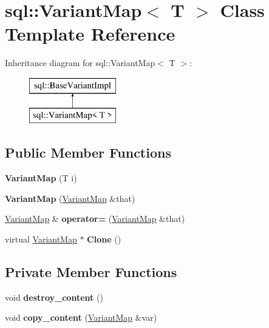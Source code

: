 \hypertarget{classsql_1_1_variant_map}{}\section{sql\+:\+:Variant\+Map$<$ T $>$ Class Template Reference}
\label{classsql_1_1_variant_map}
Inheritance diagram for sql\+:\+:Variant\+Map$<$ T $>$\+:\begin{figure}[H]
\begin{center}
\leavevmode
\includegraphics[height=2.000000cm]{classsql_1_1_variant_map}
\end{center}
\end{figure}
\subsection*{Public Member Functions}
\begin{DoxyCompactItemize}
\item 
\hypertarget{classsql_1_1_variant_map_a57a3ef9f7780d378e7e8ec2d6f2782db}{}\label{classsql_1_1_variant_map_a57a3ef9f7780d378e7e8ec2d6f2782db} 
{\bfseries Variant\+Map} (T i)
\item 
\hypertarget{classsql_1_1_variant_map_a460d04a63f6efdb9f8e23f541faefb39}{}\label{classsql_1_1_variant_map_a460d04a63f6efdb9f8e23f541faefb39} 
{\bfseries Variant\+Map} (\hyperlink{classsql_1_1_variant_map}{Variant\+Map} \&that)
\item 
\hypertarget{classsql_1_1_variant_map_ac1962c1da18635bc551264e1821dc5d2}{}\label{classsql_1_1_variant_map_ac1962c1da18635bc551264e1821dc5d2} 
\hyperlink{classsql_1_1_variant_map}{Variant\+Map} \& {\bfseries operator=} (\hyperlink{classsql_1_1_variant_map}{Variant\+Map} \&that)
\item 
\hypertarget{classsql_1_1_variant_map_a6fad5d2f5006961456fb8f8ef649c0bc}{}\label{classsql_1_1_variant_map_a6fad5d2f5006961456fb8f8ef649c0bc} 
virtual \hyperlink{classsql_1_1_variant_map}{Variant\+Map} $\ast$ {\bfseries Clone} ()
\end{DoxyCompactItemize}
\subsection*{Private Member Functions}
\begin{DoxyCompactItemize}
\item 
\hypertarget{classsql_1_1_variant_map_affb399a36ff664f4ea42923a681b32c1}{}\label{classsql_1_1_variant_map_affb399a36ff664f4ea42923a681b32c1} 
void {\bfseries destroy\+\_\+content} ()
\item 
\hypertarget{classsql_1_1_variant_map_a03a32a7716754227148859d40bdb527d}{}\label{classsql_1_1_variant_map_a03a32a7716754227148859d40bdb527d} 
void {\bfseries copy\+\_\+content} (\hyperlink{classsql_1_1_variant_map}{Variant\+Map} \&var)
\end{DoxyCompactItemize}

